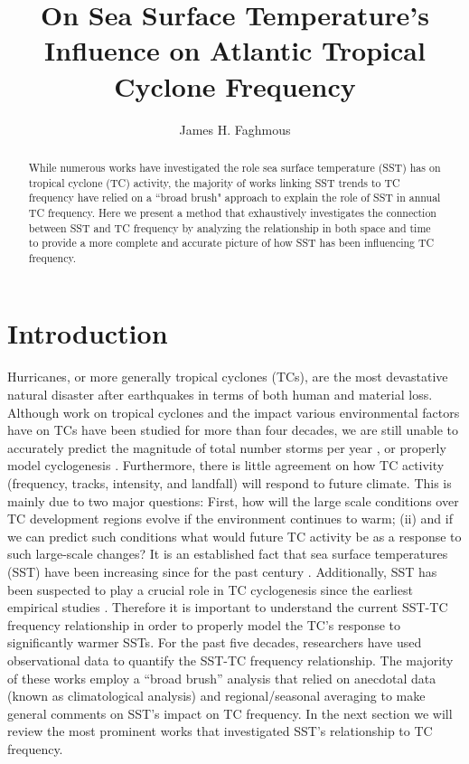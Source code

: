 \documentclass[a4paper,10pt]{article}
\title{On Sea Surface Temperature's Influence on Atlantic Tropical Cyclone Frequency}
\author{James H. Faghmous}
\begin{document}
\maketitle

\begin{abstract}
While numerous works have investigated the role sea surface temperature (SST) has on tropical cyclone (TC) activity, the majority of works linking SST trends to TC frequency have relied on a ``broad brush" approach to explain the role of SST in annual TC frequency. Here we present a method that exhaustively investigates the connection between SST and TC frequency by analyzing the relationship in both space and time to provide a more complete and accurate picture of how SST has been influencing TC frequency.  
\end{abstract}

\section{Introduction}
Hurricanes, or more generally tropical cyclones (TCs), are the most devastative natural disaster after earthquakes in terms of both human and material loss. Although work on tropical cyclones and the impact various environmental factors have on TCs have been studied for more than four decades, we are still unable to accurately predict the magnitude of total number storms per year \cite{emanuel2008}, or properly model cyclogenesis \cite{emanuel2003, pielke2005a, emanuel2008, grossmann2008}. Furthermore, there is little agreement on how TC activity (frequency, tracks, intensity, and landfall) will respond to future climate. This is mainly due to two major questions:
First, how will the large scale conditions over TC development regions evolve if the environment continues to warm; (ii) and if we can predict such conditions what would future TC activity be as a response to such large-scale changes?
It is an established fact that sea surface temperatures (SST) have been increasing since for the past century \cite{ipcc2007}. Additionally, SST has been suspected to play a crucial role in TC cyclogenesis since the earliest empirical studies \cite{palmen1948,gray1968,carlson1971}. Therefore it is important to understand the current SST-TC frequency relationship in order to properly model the TC's response to significantly warmer SSTs. For the past five decades, researchers have used observational data to quantify the SST-TC frequency relationship. The majority of these works employ a ``broad brush'' analysis that relied on anecdotal data (known as climatological analysis) and regional/seasonal averaging to make general comments on SST's impact on TC frequency. 
In the next section we will review the most prominent works that investigated SST's relationship to TC frequency. 
\end{document}
